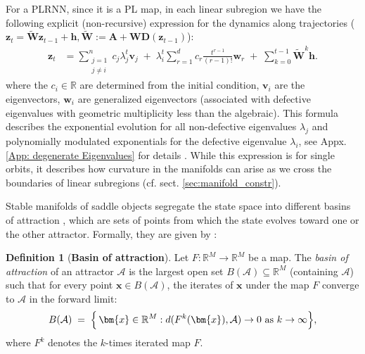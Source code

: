 \documentclass{article}
\theoremstyle{example}
\theoremstyle{plain}
\theoremstyle{definition}
\newtheorem{definition}{Definition}
\theoremstyle{remark}
\def\vh{{\bm{h}}}
\def\vv{{\bm{v}}}
\def\vw{{\bm{w}}}
\def\vx{{\bm{x}}}
\def\vz{{\bm{z}}}
\def\mA{{\bm{A}}}
\def\mD{{\bm{D}}}
\def\mW{{\bm{W}}}
\begin{document}
For a PLRNN, since it is a PL map, in each linear subregion we have the following explicit (non-recursive) expression for the dynamics along trajectories ($\vz_{t} = \tilde{\mW} \vz_{t-1} + \vh, \tilde{\mW}:=\mA + \mW\mD(\vz_{t-1})$): 
\begin{align}
\label{eq:gen_soln_main}
\vz_t 
&= \sum_{\substack{j=1 \\ j \neq i}}^{n} c_j \lambda_j^t \vv_j 
\;+\; 
\lambda_i^t \sum_{r=1}^{d} c_r \frac{t^{r-1}}{(r-1)!} \vw_r 
\;+\;
\sum_{k=0}^{t-1} \tilde{\mW}^k \vh.
\end{align}
where the $c_i \in \mathbb{R}$ are determined from the initial condition, $\vv_i$ are the eigenvectors, $\vw_i$ are generalized eigenvectors (associated with defective eigenvalues with geometric multiplicity less than the algebraic).  
This formula describes the exponential evolution for all non-defective eigenvalues $\lambda_j$ and polynomially modulated exponentials for the defective eigenvalue $\lambda_i$, see Appx. \ref{App: degenerate Eigenvalues} for details \citep{per,hirsch2013differential}. While this expression is for single orbits, it describes how curvature in the manifolds can arise as we cross the boundaries of linear subregions (cf. sect. \ref{sec:manifold_constr}).

Stable manifolds of saddle objects segregate the state space into
different basins of attraction \citep{ganatra2022sketching}, which are sets of points from which the state evolves toward one or the other attractor. Formally, they are given by \citep{alligood1996}: 
\begin{definition}[\textbf{Basin of attraction}]
Let \( F:\mathbb{R}^M \to \mathbb{R}^M \) be a %
map.
The \textit{basin of attraction} of an attractor $\mathcal{A}$ is the largest open set \( B(\mathcal{A})\subseteq \mathbb{R}^M \) (containing $\mathcal{A}$) such that for every point \( \vx \in B(\mathcal{A}) \), the iterates of $\vx$ under the map $F$
converge to $\mathcal{A}$ in the forward limit:
\[
B(\mathcal{A}) \;=\; \Bigl\{\, \vx \in \mathbb{R}^M: 
  d (F^k(\vx), \mathcal{A}) \to 0 \text{ as } k \to \infty 
\Bigr\},
\]
where \( F^k \) denotes the \( k \)-times iterated map \( F \).
\end{definition} %
\end{document}
